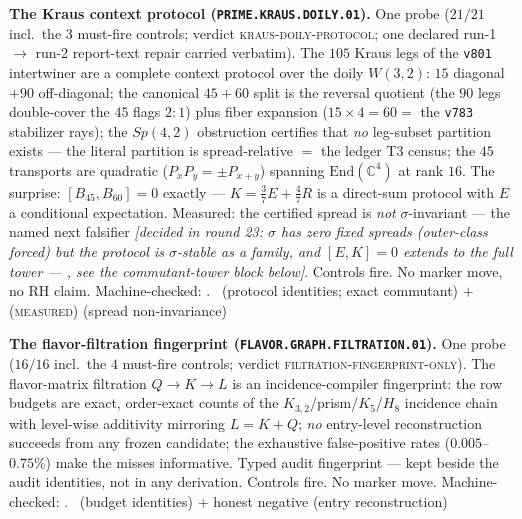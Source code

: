\documentclass[11pt,a4paper]{article}
\theoremstyle{definition}
\begin{document}
\par\smallskip\noindent\textbf{The Kraus context protocol
(\texttt{PRIME.KRAUS.DOILY.01}).}
One probe ($21/21$ incl.\ the $3$ must-fire controls; verdict
\textsc{kraus-doily-protocol}; one declared run-1 $\to$ run-2
report-text repair carried verbatim).  The $105$ Kraus legs of the
\texttt{v801} intertwiner are a complete context protocol over the
doily $W(3,2)$: $15$ diagonal $+90$ off-diagonal; the canonical
$45+60$ split is the reversal quotient (the $90$ legs double-cover
the $45$ flags $2{:}1$) plus fiber expansion
($15\times4=60=$ the \texttt{v783} stabilizer rays); the
$Sp(4,2)$ obstruction certifies that \emph{no} leg-subset
partition exists --- the literal partition is spread-relative $=$
the ledger T3 census; the $45$ transports are quadratic
($P_xP_y=\pm P_{x+y}$) spanning $\mathrm{End}(\mathbb C^4)$ at rank
$16$.  The surprise: $[B_{45},B_{60}]=0$ exactly ---
$K=\tfrac37E+\tfrac47R$ is a direct-sum protocol with $E$ a
conditional expectation.  Measured: the certified spread is
\emph{not} $\sigma$-invariant --- the named next falsifier
\emph{[decided in round 23: $\sigma$ has zero fixed spreads
(outer-class forced) but the protocol is $\sigma$-stable as a
family, and $[E,K]=0$ extends to the full tower ---
, see the commutant-tower
block below]}.
Controls fire.  No marker move, no RH claim.
Machine-checked: .
\mE\ (protocol identities; exact commutant) $+$ (\textsc{measured})
(spread non-invariance)
\par\smallskip

\par\smallskip\noindent\textbf{The flavor-filtration fingerprint
(\texttt{FLAVOR.GRAPH.FILTRATION.01}).}
One probe ($16/16$ incl.\ the $4$ must-fire controls; verdict
\textsc{filtration-fingerprint-only}).  The flavor-matrix
filtration $Q\to K\to L$ is an incidence-compiler fingerprint: the
row budgets are exact, order-exact counts of the
$K_{3,2}$/prism/$K_5$/$H_8$ incidence chain with level-wise
additivity mirroring $L=K+Q$; \emph{no} entry-level reconstruction
succeeds from any frozen candidate; the exhaustive false-positive
rates ($0.005$--$0.75\%$) make the misses informative.  Typed
audit fingerprint --- kept beside the audit identities, not in any
derivation.  Controls fire.  No marker move.
Machine-checked: .
\mE\ (budget identities) $+$ honest negative (entry
reconstruction)
\par\smallskip
\end{document}
